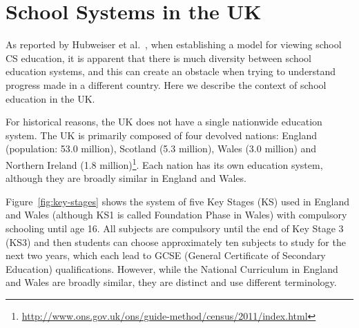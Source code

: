 \documentclass{sig-alternate}
\begin{document}
\section{School Systems in the UK}\label{sec:schools}

As reported by Hubweiser et al.~\cite{hubwieser-et-al:2011}, when establishing a
model for viewing school CS education, it is apparent that there is
much diversity between school education systems, and this can create
an obstacle when trying to understand progress made in a different
country. Here we describe the context of school education in the UK.

For historical reasons, the UK does not have a single nationwide
education system.  The UK is primarily composed of four devolved
nations: England (population: 53.0 million), Scotland (5.3 million),
Wales (3.0 million) and Northern Ireland (1.8
million)\footnote{\url{http://www.ons.gov.uk/ons/guide-method/census/2011/index.html}}.
Each nation has its own education system, although they are broadly
similar in England and Wales.



Figure~\ref{fig:key-stages} shows the system of five Key Stages (KS)
used in England and Wales (although KS1 is called Foundation Phase in
Wales) with compulsory schooling until age 16. All subjects are
compulsory until the end of Key Stage 3 (KS3) and then students can
choose approximately ten subjects to study for the next two years,
which each lead to GCSE (General Certificate of Secondary Education)
qualifications. However, while the National Curriculum in England and
Wales are broadly similar, they are distinct and use different
terminology.
\end{document}
